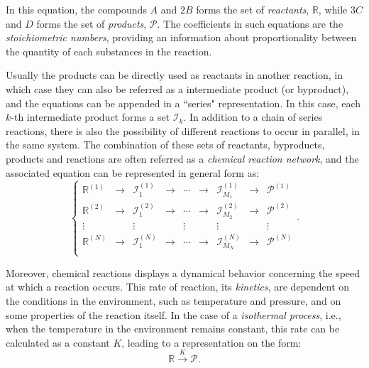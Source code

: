 \documentclass[a4paper,11pt]{book}
\numberwithin{figure}{chapter}
\numberwithin{equation}{chapter}
\numberwithin{table}{chapter}
\theoremstyle{definition}
\begin{document}
In this equation, the compounds $A$ and $2 B$ forms the set of \textit{reactants}, $\mathbb{R}$, while $3 C$ and $D$ forms the set of \textit{products}, $\mathcal{P}$. The coefficients in such equations are the \textit{stoichiometric numbers}, providing an information about proportionality between the quantity of each substances in the reaction. 

Usually the products can be directly used as reactants in another reaction, in which case they can also be referred as a intermediate product (or byproduct), and the equations can be appended in a ``series" representation. In this case, each $k$-th intermediate product forms a set $\mathcal{I}_k$. In addition to a chain of series reactions, there is also the possibility of different reactions to occur in parallel, in the same system. The combination of these sets of reactants, byproducts, products and reactions are often referred as a \textit{chemical reaction network}, and the associated equation can be represented in general form as:
\begin{equation} \label{eq:chemNetwork}
\left\{ \begin{matrix}
    \mathbb{R}^{(1)}  & \longrightarrow & \mathcal{I}^{(1)}_1  &  \longrightarrow & \cdots & \longrightarrow & \mathcal{I}^{(1)}_{M_1} & \longrightarrow & \mathcal{P}^{(1)} \\
    \mathbb{R}^{(2)} & \longrightarrow & \mathcal{I}^{(2)}_1  &  \longrightarrow & \cdots & \longrightarrow & \mathcal{I}^{(2)}_{M_2} & \longrightarrow & \mathcal{P}^{(2)} \\
    \vdots &  & \vdots &  & \vdots &  & \vdots &  & \vdots \\
    \mathbb{R}^{(N)} & \longrightarrow & \mathcal{I}^{(N)}_1  &  \longrightarrow & \cdots & \longrightarrow & \mathcal{I}^{(N)}_{M_N} & \longrightarrow & \mathcal{P}^{(N)} \\
\end{matrix} \right.
.\end{equation} 

Moreover, chemical reactions displays a dynamical behavior concerning the speed at which a reaction occurs. This rate of reaction, its \textit{kinetics}, are dependent on the conditions in the environment, such as temperature and pressure, and on some properties of the reaction itself. In the case of a \textit{isothermal process}, i.e., when the temperature in the environment remains constant, this rate can be calculated as a constant $K$, leading to a representation on the form:
\begin{equation}
    \mathbb{R} \overset{K}{\longrightarrow} \mathcal{P}
.\end{equation} 
\end{document}
